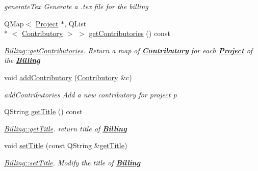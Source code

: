 \begin{DoxyCompactItemize}
\begin{DoxyCompactList}\small\item\em generate\-Tex Generate a .tex file for the billing \end{DoxyCompactList}\item 
Q\-Map$<$ \hyperlink{classModels_1_1Project}{Project} $\ast$, Q\-List\\*
$<$ \hyperlink{classModels_1_1Contributory}{Contributory} $>$ $>$ \hyperlink{classModels_1_1Billing_a9c5e944c560fcecb356a9293b26f1ec6}{get\-Contributories} () const 
\begin{DoxyCompactList}\small\item\em \hyperlink{classModels_1_1Billing_a9c5e944c560fcecb356a9293b26f1ec6}{Billing\-::get\-Contributories}. Return a map of {\bfseries \hyperlink{classModels_1_1Contributory}{Contributory}} for each {\bfseries \hyperlink{classModels_1_1Project}{Project}} of the {\bfseries \hyperlink{classModels_1_1Billing}{Billing}} \end{DoxyCompactList}\item 
void \hyperlink{classModels_1_1Billing_a3636d785d2cb77d83d21a795e1f91a60}{add\-Contributory} (\hyperlink{classModels_1_1Contributory}{Contributory} \&c)
\begin{DoxyCompactList}\small\item\em add\-Contributories Add a new contributory for project p \end{DoxyCompactList}\item 
Q\-String \hyperlink{classModels_1_1Billing_a15cd358ce3cab05668c62c0771afdb85}{get\-Title} () const 
\begin{DoxyCompactList}\small\item\em \hyperlink{classModels_1_1Billing_a15cd358ce3cab05668c62c0771afdb85}{Billing\-::get\-Title}. return title of {\bfseries \hyperlink{classModels_1_1Billing}{Billing}} \end{DoxyCompactList}\item 
void \hyperlink{classModels_1_1Billing_ae20cea169abdffa5daaa368547425928}{set\-Title} (const Q\-String \&\hyperlink{classModels_1_1Billing_a15cd358ce3cab05668c62c0771afdb85}{get\-Title})
\begin{DoxyCompactList}\small\item\em \hyperlink{classModels_1_1Billing_ae20cea169abdffa5daaa368547425928}{Billing\-::set\-Title}. Modify the title of {\bfseries \hyperlink{classModels_1_1Billing}{Billing}} \end{DoxyCompactList}\item 

\end{DoxyCompactItemize}
